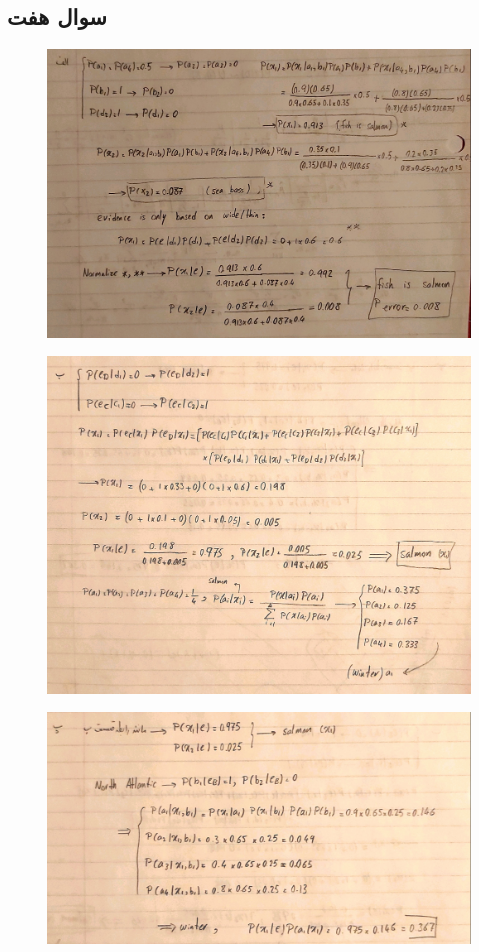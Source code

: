 \documentclass[12pt,onecolumn,a4paper]{article}
\begin{document}
\subsection{سوال هفت}
\begin{figure}[h!]
    \includegraphics[width=\linewidth]{q7a.jpg}    
\end{figure}
\newpage
\begin{figure}[h!]
    \includegraphics[width=\linewidth]{q7b.jpg}    
\end{figure}
\begin{figure}[h!]
    \includegraphics[width=\linewidth]{q7c.jpg}    
\end{figure}
\end{document}
